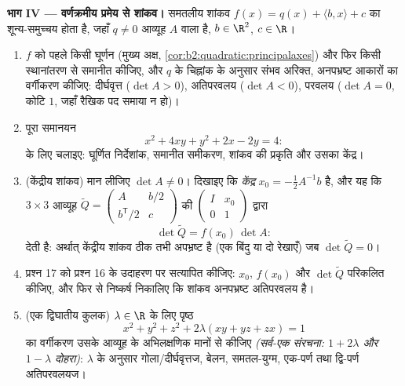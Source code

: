 \begin{problem}
\medskip
\noindent\textbf{भाग IV --- वर्णक्रमीय प्रमेय से शांकव।} समतलीय शांकव
$f(x) = q(x) + \langle b,
x\rangle + c$ का शून्य-समुच्चय होता है, जहाँ $q \neq 0$ आव्यूह $A$ वाला  है,
$b \in \R^2$, $c \in \R$।
\begin{enumerate}[resume]
  \item $f$ को पहले किसी घूर्णन (मुख्य अक्ष, \cref{cor:b2:quadratic:principalaxes}) और फिर किसी स्थानांतरण
        से समानीत कीजिए, और $q$ के चिह्नांक के अनुसार संभव अरिक्त,
        अनपभ्रष्ट आकारों का वर्गीकरण कीजिए: दीर्घवृत्त ($\det A > 0$), अतिपरवलय
        ($\det A < 0$), परवलय ($\det A = 0$, कोटि $1$, जहाँ रैखिक पद समाया न हो)।
  \item पूरा समानयन
        \[
        x^2 + 4xy + y^2 + 2x - 2y = 4 :
        \]
        के लिए चलाइए: घूर्णित निर्देशांक, समानीत समीकरण, शांकव की प्रकृति
        और उसका केंद्र।
  \item (केंद्रीय शांकव) मान लीजिए $\det A \neq 0$। दिखाइए कि \emph{केंद्र} $x_0 = -\frac12 A^{-1}b$ है,
        और यह कि $3\times3$ आव्यूह $\widetilde Q
        = \begin{pmatrix} A & b/2 \\ b^{\mathsf T}/2 &
        c\end{pmatrix}$ की $\begin{pmatrix} I & x_0\\ 0 &
        1\end{pmatrix}$ द्वारा 
        \[
        \det\widetilde Q = f(x_0)\,\det A :
        \]
        देती है: अर्थात् केंद्रीय शांकव ठीक तभी अपभ्रष्ट है (एक बिंदु या
        दो रेखाएँ) जब $\det\widetilde Q = 0$।
  \item प्रश्न 17 को प्रश्न 16 के उदाहरण पर सत्यापित कीजिए: $x_0$, $f(x_0)$
        और $\det\widetilde Q$ परिकलित कीजिए, और फिर से निष्कर्ष निकालिए कि शांकव
        अनपभ्रष्ट अतिपरवलय है।
  \item (एक द्विघातीय कुलक) $\lambda \in \R$ के लिए पृष्ठ
        \[
        x^2 + y^2 + z^2 + 2\lambda(xy + yz + zx) = 1
        \]
        का वर्गीकरण उसके आव्यूह के अभिलक्षणिक मानों से कीजिए \emph{(सर्व-एक
        संरचना:  $1 + 2\lambda$ और $1 -
        \lambda$ दोहरा)}: $\lambda$ के अनुसार
        गोला/दीर्घवृत्तज, बेलन, समतल-युग्म, एक-पर्ण तथा द्वि-पर्ण
        अतिपरवलयज।
\end{enumerate}


\end{problem}
